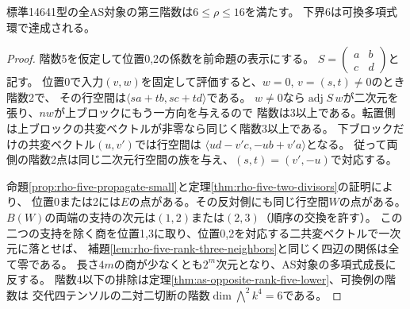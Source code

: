 \begin{theorem}[第三階数の鋭い下界]\label{thm:as-opposite-rank-sharp-six}
標準14641型の全AS対象の第三階数は$6\le\rho\le16$を満たす。
下界6は可換多項式環で達成される。
\end{theorem}
\begin{proof}
階数5を仮定して位置0,2の係数を前命題の表示にする。
$S=\left(\begin{smallmatrix}a&b\\c&d\end{smallmatrix}\right)$と記す。
位置0で入力$(v,w)$を固定して評価すると、$w=0$, $v=(s,t)\ne0$のとき階数2で、
その行空間は$\langle sa+tb,sc+td\rangle$である。
$w\ne0$なら$\operatorname{adj}S\,w$が二次元を張り、$n w$が上ブロックにもう一方向を与えるので
階数は3以上である。転置側は上ブロックの共変ベクトルが非零なら同じく階数3以上である。
下ブロックだけの共変ベクトル$(u,v')$では行空間は
$\langle ud-v'c,-ub+v'a\rangle$となる。
従って両側の階数2点は同じ二次元行空間の族を与え、$(s,t)=(v',-u)$で対応する。

命題\ref{prop:rho-five-propagate-small}と定理\ref{thm:rho-five-two-divisors}の証明により、
位置0または2には$E$の点がある。その反対側にも同じ行空間$W$の点がある。
$B(W)$の両端の支持の次元は$(1,2)$または$(2,3)$（順序の交換を許す）。
この二つの支持を除く商を位置1,3に取り、位置0,2を対応する二共変ベクトルで一次元に落とせば、
補題\ref{lem:rho-five-rank-three-neighbors}と同じく四辺の関係は全て零である。
長さ$4m$の商が少なくとも$2^m$次元となり、AS対象の多項式成長に反する。
階数4以下の排除は定理\ref{thm:as-opposite-rank-five-lower}、可換例の階数は
交代四テンソルの二対二切断の階数$\dim\bigwedge^2 k^4=6$である。
\end{proof}
